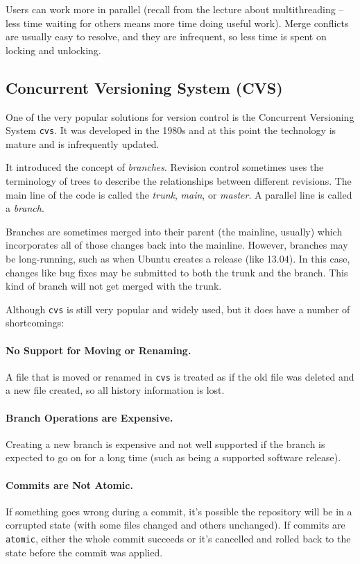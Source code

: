 Users can work more in parallel (recall from the lecture about multithreading -- less time waiting for others means more time doing useful work). Merge conflicts are usually easy to resolve, and they are infrequent, so less time is spent on locking and unlocking. 

\subsection*{Concurrent Versioning System (CVS)}
One of the very popular solutions for version control is the Concurrent Versioning System \texttt{cvs}. It was developed in the 1980s and at this point the technology is mature and is infrequently updated.

It introduced the concept of \emph{branches}. Revision control sometimes uses the terminology of trees to describe the relationships between different revisions. The main line of the code is called the \emph{trunk}, \emph{main}, or \emph{master}. A parallel line is called a \emph{branch}.

Branches are sometimes merged into their parent (the mainline, usually) which incorporates all of those changes back into the mainline. However, branches may be long-running, such as when Ubuntu creates a release (like 13.04). In this case, changes like bug fixes may be submitted to both the trunk and the branch. This kind of branch will not get merged with the trunk.

Although \texttt{cvs} is still very popular and widely used, but it does have a number of shortcomings:

\paragraph{No Support for Moving or Renaming.} A file that is moved or renamed in \texttt{cvs} is treated as if the old file was deleted and a new file created, so all history information is lost.

\paragraph{Branch Operations are Expensive.} Creating a new branch is expensive and not well supported if the branch is expected to go on for a long time (such as being a supported software release). 

\paragraph{Commits are Not Atomic.} If something goes wrong during a commit, it's possible the repository will be in a corrupted state (with some files changed and others unchanged). If commits are \texttt{atomic}, either the whole commit succeeds or it's cancelled and rolled back to the state before the commit was applied.

